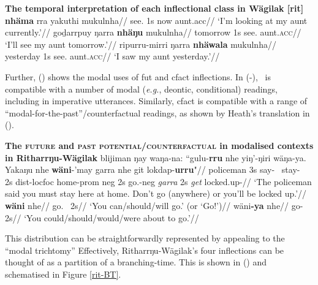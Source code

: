 \pex \textbf{The temporal interpretation of each inflectional class in Wägilak [\gls{rit}]}\label{wag-infls}
\a\begingl\gla {}\textbf{nhäma} rra yakuthi mukulnha//
\glb see.\textbf{{\I}} 1s now aunt.\gls{acc}//
\glft`I'm looking at my aunt currently.'\trailingcitation{[RN~20190520]}//\endgl{}
\a\begingl\gla {}goḏarrpuy ŋarra \textbf{nhäŋu} mukulnha//
\glb tomorrow 1s see.\II{} aunt.\textsc{acc}//
\glft`I'll see my aunt tomorrow.'\trailingcitation{[DW~20190522]}//\endgl
\a\begingl\gla {}ripurru-mirri ŋarra \textbf{nhäwala} mukulnha//
\glb yesterday 1s see.\textbf{\III} aunt.\textsc{acc}//
\glft`I saw my aunt yesterday.'\trailingcitation{[RN~20190522]}//\endgl{}
\xe

\noindent Further, () shows the modal uses of \gls{fut} and \gls{cfact} inflections. In (-), \II~is compatible with a number of modal (\textit{e.g.}, deontic, conditional) readings, including in imperative utterances. Similarly, \gls{cfact} is compatible with a range of ``modal-for-the-past''\slash counter\-factual readings, as shown by Heath's translation in ().


\pex \textbf{The \textsc{future} and \textsc{past potential/counterfactual} in modalised contexts in Ritharrŋu-Wägilak}
\a \begingl\gla blijiman ŋay waŋa-na: ``gulu-\textbf{rru} nhe yiŋ'-ŋiri wäŋa-ya. Yakaŋu nhe \textbf{wäni}-'may garra nhe git lokdap-\textbf{urru}"//
\glb policeman 3s say-\III~ stay-\II~ 2s \gls{dist}-\gls{loc}\textdblhyphen\gls{foc} home-\gls{prom} \gls{neg} 2s go.\II-\gls{neg} \textit{garra} 2s \textit{get} locked.up-\II//
\glft`The policeman said you must stay here at home. Don't go (anywhere) or you'll be locked up.'\trailingcitation{[RŊ~20190520~18']}//\endgl
\a\begingl\gla \textbf{wäni} nhe//
\glb go.\II~ 2s//
\glft `You can/should/will go.' (or `Go!')//\endgl
\a\begingl\gla wäni\textbf{-ya} nhe//
\glb go-\V~ 2s//
\glft`You could/should/would/were about to go.'//\endgl
\xe

This distribution can be straightforwardly represented by appealing to the ``modal trichtomy'' \citetext{that is, modelling branching time as composed of an \textit{actual, potential} and \textit{counterfactual} domain, \textit{cf.} \citet{VonPrince2019,VonPrincea} --- introduced in \S \ref{vP-trich}, compare (), \textit{p.}~.} Effectively, Ritharrŋu-Wägilak's four inflections can be thought of as a partition of a branching-time. This is shown in (\nextx) and schematised in Figure \ref{rit-BT}.



